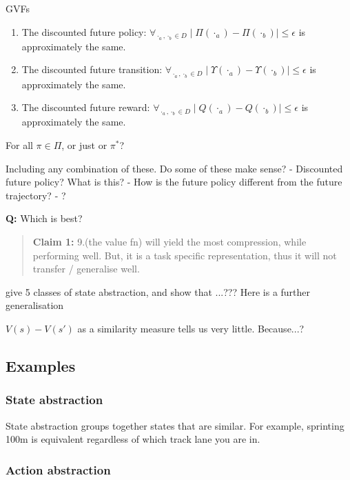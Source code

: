 GVFs


\begin{enumerate}
\def\labelenumi{\arabic{enumi}.}
\setcounter{enumi}{6}
\tightlist
\item
  The discounted future policy:
  \(\forall_{\cdot_a, \cdot_b \in D} \mid \Pi(\cdot_a) - \Pi(\cdot_b)\mid \le \epsilon\)
  is approximately the same.
\item
  The discounted future transition:
  \(\forall_{\cdot_a, \cdot_b \in D} \mid \Upsilon(\cdot_a) - \Upsilon (\cdot_b)\mid \le \epsilon\)
  is approximately the same.
\item
  The discounted future reward:
  \(\forall_{\cdot_a, \cdot_b \in D} \mid Q(\cdot_a) - Q(\cdot_b)\mid \le \epsilon\)
  is approximately the same.
\end{enumerate}

For all $\pi \in \Pi$, or just or $\pi^{* }$?

Including any combination of these.
Do some of these make sense?
- Discounted future policy? What is this?
- How is the future policy different from the future trajectory?
- ?

\textbf{Q:} Which is best?

\begin{quote}
\textbf{Claim 1:} 9.(the value fn) will yield the most compression,
while performing well. But, it is a task specific representation, thus
it will not transfer / generalise well.
\end{quote}


\cite{Littman2006} give 5 classes of state abstraction, and show that ...???
Here is a further generalisation


$V(s) - V(s')$ as a similarity measure tells us very little. Because...?



\subsection{Examples}

\subsubsection{State abstraction}

State abstraction groups together states that are similar. For example,
sprinting 100m is equivalent regardless of which track lane you are in.

\subsubsection{Action abstraction}

